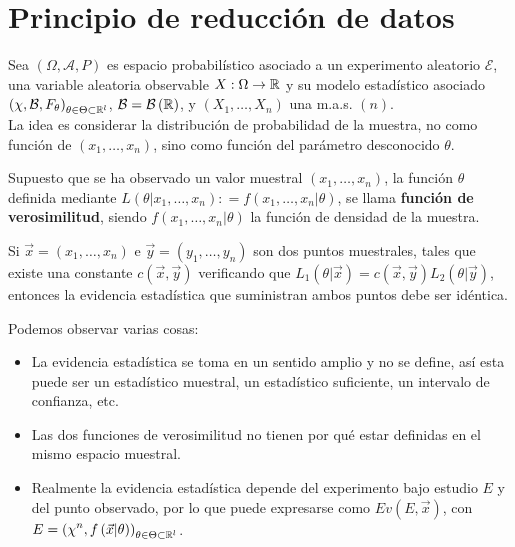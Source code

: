 \section{Principio de reducción de datos}
Sea $\displaystyle \left(\Omega, \mathcal{A}, P\right) $ es espacio probabilístico asociado a un experimento aleatorio $\displaystyle \mathcal{E} $, una variable aleatoria observable $\displaystyle X : \Omega \to \mathbb{R} $ y su modelo estadístico asociado $\displaystyle \left(\chi, \mathcal{B}, F_{\theta}\right)_{\theta \in \Theta \subset \mathbb{R}^{l}} $, $\displaystyle \mathcal{B}=\mathcal{B}\left(\mathbb{R}\right) $, y $\displaystyle \left(X_{1}, \ldots, X_{n}\right) $ una m.a.s. $\displaystyle \left(n\right) $. \\
La idea es considerar la distribución de probabilidad de la muestra, no como función de $\displaystyle \left(x_{1}, \ldots, x_{n}\right) $, sino como función del parámetro desconocido $\displaystyle \theta $. 
\begin{definition}
Supuesto que se ha observado un valor muestral $\displaystyle \left(x_{1}, \ldots, x_{n}\right) $, la función $\displaystyle \theta $ definida mediante $\displaystyle L\left(\theta|x_{1}, \ldots, x_{n}\right) : = f\left(x_{1}, \ldots, x_{n} | \theta \right) $, se llama \textbf{función de verosimilitud}, siendo $\displaystyle f\left(x_{1}, \ldots, x_{n}|\theta \right) $ la función de densidad de la muestra. 
\end{definition}
\begin{definition}
Si $\displaystyle \vec{x}= \left(x_{1}, \ldots, x_{n}\right) $ e $\displaystyle \vec{y}= \left(y_{1}, \ldots, y_{n}\right) $ son dos puntos muestrales, tales que existe una constante $\displaystyle c\left(\vec{x}, \vec{y}\right) $ verificando que $\displaystyle L_{1}\left(\theta | \vec{x}\right)=c\left(\vec{x}, \vec{y}\right)L_{2}\left(\theta|\vec{y}\right) $, entonces la evidencia estadística que suministran ambos puntos debe ser idéntica. 
\end{definition}
\begin{observation}
Podemos observar varias cosas:
\begin{itemize}
\item La evidencia estadística se toma en un sentido amplio y no se define, así esta puede ser un estadístico muestral, un estadístico suficiente, un intervalo de confianza, etc. 
\item Las dos funciones de verosimilitud no tienen por qué estar definidas en el mismo espacio muestral. 
\item Realmente la evidencia estadística depende del experimento bajo estudio $\displaystyle E $ y del punto observado, por lo que puede expresarse como $\displaystyle Ev\left(E, \vec{x}\right) $, con $\displaystyle E = \left(\chi^{n}, f\left(\vec{x}|\theta\right)\right)_{\theta \in \Theta \subset \mathbb{R}^{l}} $. 
\end{itemize}
\end{observation}
